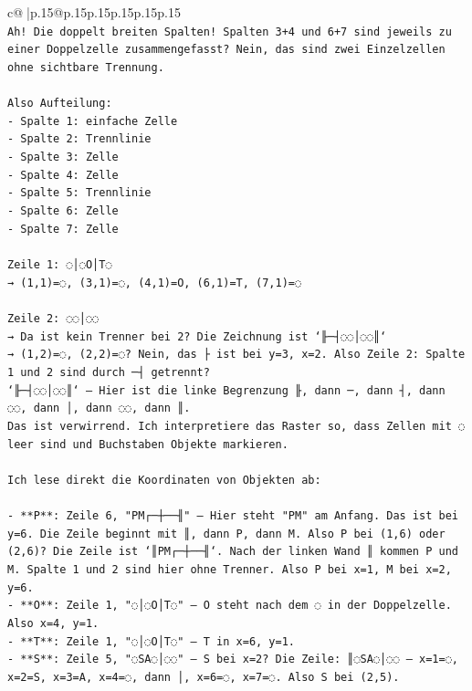 \documentclass{article}
\begin{document}
{\begin{supertabular}{c@{$\;$}|p{.15\linewidth}@{}p{.15\linewidth}p{.15\linewidth}p{.15\linewidth}p{.15\linewidth}p{.15\linewidth}}
{{{\\ 
\texttt{Ah! Die doppelt breiten Spalten! Spalten 3+4 und 6+7 sind jeweils zu einer Doppelzelle zusammengefasst? Nein, das sind zwei Einzelzellen ohne sichtbare Trennung.} \\
\\ 
\texttt{Also Aufteilung:} \\
\texttt{{-} Spalte 1: einfache Zelle} \\
\texttt{{-} Spalte 2: Trennlinie} \\
\texttt{{-} Spalte 3: Zelle} \\
\texttt{{-} Spalte 4: Zelle} \\
\texttt{{-} Spalte 5: Trennlinie} \\
\texttt{{-} Spalte 6: Zelle} \\
\texttt{{-} Spalte 7: Zelle} \\
\\ 
\texttt{Zeile 1: ◌│◌O│T◌} \\
\texttt{→ (1,1)=◌, (3,1)=◌, (4,1)=O, (6,1)=T, (7,1)=◌} \\
\\ 
\texttt{Zeile 2: ◌◌│◌◌} \\
\texttt{→ Da ist kein Trenner bei 2? Die Zeichnung ist `╟─┤◌◌│◌◌║`} \\
\texttt{→ (1,2)=◌, (2,2)=◌? Nein, das ├ ist bei y=3, x=2. Also Zeile 2: Spalte 1 und 2 sind durch ─┤ getrennt? } \\
\texttt{`╟─┤◌◌│◌◌║` — Hier ist die linke Begrenzung ╟, dann ─, dann ┤, dann ◌◌, dann │, dann ◌◌, dann ║.} \\
\texttt{Das ist verwirrend. Ich interpretiere das Raster so, dass Zellen mit ◌ leer sind und Buchstaben Objekte markieren.} \\
\\ 
\texttt{Ich lese direkt die Koordinaten von Objekten ab:} \\
\\ 
\texttt{{-} **P**: Zeile 6, "PM┌─┼──╢" — Hier steht "PM" am Anfang. Das ist bei y=6. Die Zeile beginnt mit ║, dann P, dann M. Also P bei (1,6) oder (2,6)? Die Zeile ist `║PM┌─┼──╢`. Nach der linken Wand ║ kommen P und M. Spalte 1 und 2 sind hier ohne Trenner. Also P bei x=1, M bei x=2, y=6.} \\
\texttt{{-} **O**: Zeile 1, "◌│◌O│T◌" — O steht nach dem ◌ in der Doppelzelle. Also x=4, y=1.} \\
\texttt{{-} **T**: Zeile 1, "◌│◌O│T◌" — T in x=6, y=1.} \\
\texttt{{-} **S**: Zeile 5, "◌SA◌│◌◌" — S bei x=2? Die Zeile: ║◌SA◌│◌◌ — x=1=◌, x=2=S, x=3=A, x=4=◌, dann │, x=6=◌, x=7=◌. Also S bei (2,5).} \\
}}}
\end{supertabular}}
\end{document}
